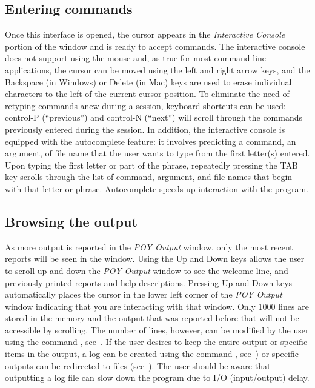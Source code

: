 {\subsection{Entering commands}
Once this \poy interface is opened, the cursor appears in the \emph{Interactive Console} portion of the window and is ready to accept commands. The interactive console does not support using the mouse and, as true for most command-line applications, the cursor can be moved using the left and right arrow keys, and the Backspace (in Windows) or Delete (in Mac) keys are used to erase individual characters to the left of the current cursor position. To eliminate the need of retyping commands anew during a \poy session, keyboard shortcuts can be used: control-P (``previous'') and control-N (``next'') will scroll through the commands previously entered during the session. In addition, the interactive console is equipped with the autocomplete feature: it involves \poy predicting a command, an argument, of file name that the user wants to type from the first letter(s) entered. Upon typing the first letter or part of the phrase, repeatedly pressing the TAB key scrolls through the list of command, argument, and file names that begin with that letter or phrase. Autocomplete speeds up interaction with the program.

\subsection{Browsing the output}
As more output is reported in the \emph{POY Output} window, only the most recent reports will be seen in the window. Using the Up and Down keys allows the user to scroll up and down the \emph{POY Output} window to see the welcome line, and previously printed reports and help descriptions. Pressing Up and Down keys automatically places the cursor in the lower left corner of the \emph{POY Output} window indicating that you are interacting with that window. Only 1000 lines are stored in the memory and the output that was reported before that will not be accessible by scrolling. The number of lines, however, can be modified by the user using the command , see~. If the user desires to keep the entire output or specific items in the output, a log can be created using the command , see~) or specific outputs can be redirected to files (see~).  The user should be aware that outputting a log file can slow down the program due to I/O (input/output) delay.

}
